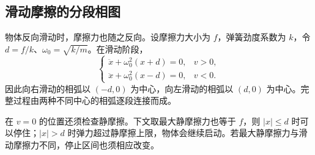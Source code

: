 \documentclass[11pt,openany,fontset=fandol]{ctexbook}
\theoremstyle{definition}\newtheorem{example}{例}[chapter]\newtheorem{exercise}{习题}[chapter]
\begin{document}
\subsection{滑动摩擦的分段相图}
物体反向滑动时，摩擦力也随之反向。设摩擦力大小为 $f$，弹簧劲度系数为 $k$，令 $d=f/k$、$\omega_0=\sqrt{k/m}$。在滑动阶段，
\begin{equation}\label{mp4:eq:l4-coulomb}
\begin{cases}
\ddot x+\omega_0^2(x+d)=0,&v>0,\\
\ddot x+\omega_0^2(x-d)=0,&v<0.
\end{cases}
\end{equation}
因此向右滑动的相弧以 $(-d,0)$ 为中心，向左滑动的相弧以 $(d,0)$ 为中心。完整过程由两种不同中心的相弧逐段连接而成。

在 $v=0$ 的位置还须检查静摩擦。下文取最大静摩擦力也等于 $f$，则 $|x|\le d$ 时可以停住；$|x|>d$ 时弹力超过静摩擦上限，物体会继续启动。若最大静摩擦力与滑动摩擦力不同，停止区间也须相应改变。
\end{document}
